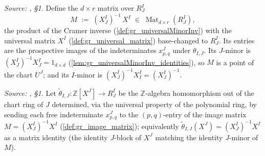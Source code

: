 \begin{definition}[The image matrix \(M = (X^I_J)^{-1} X^I\)]\leanok
  \label{def:gr_image_matrix}
  \textit{Source: \cite{nitsure-hilbert-quot}, \S 1.}
  Define the \(d \times r\) matrix over \(R^I_J\)
  \[
    M \;:=\; (X^I_J)^{-1}\, X^I \;\in\; \operatorname{Mat}_{d \times r}(R^I_J),
  \]
  the product of the Cramer inverse (\cref{def:gr_universalMinorInv}) with the
  universal matrix \(X^I\) (\cref{def:gr_universal_matrix}) base-changed to
  \(R^I_J\). Its entries are the prospective images of the indeterminates
  \(x^J_{p,q}\) under \(\theta_{I,J}\). Its \(J\)-minor is \((X^I_J)^{-1} X^I_J =
  1_{d\times d}\) (\cref{lem:gr_universalMinorInv_identities}), so \(M\) is a
  point of the chart \(U^J\); and its \(I\)-minor is \((X^I_J)^{-1} X^I_I =
  (X^I_J)^{-1}\).
\end{definition}

\begin{definition}\leanok
  \label{def:gr_transition_pre}
  \textit{Source: \cite{nitsure-hilbert-quot}, \S 1.}
  Let \(\tilde\theta_{I,J} : \mathbb{Z}[X^J] \to R^I_J\) be the
  \(\mathbb{Z}\)-algebra homomorphism out of the chart ring of \(J\) determined,
  via the universal property of the polynomial ring, by sending each free
  indeterminate \(x^J_{p,q}\) to the \((p,q)\)-entry of the image matrix \(M =
  (X^I_J)^{-1} X^I\) (\cref{def:gr_image_matrix}); equivalently
  \(\tilde\theta_{I,J}(X^J) = (X^I_J)^{-1} X^I\) as a matrix identity (the
  identity \(J\)-block of \(X^J\) matching the identity \(J\)-minor of \(M\)).
\end{definition}

